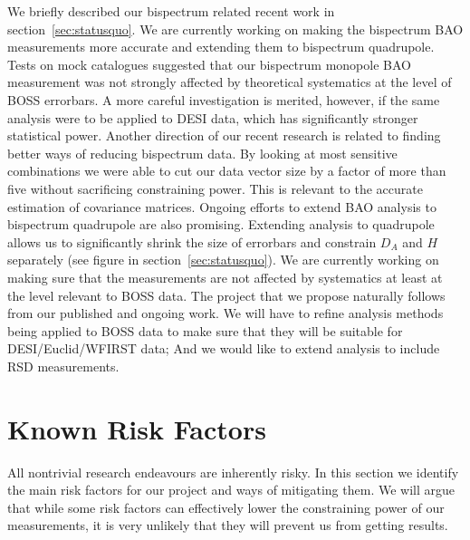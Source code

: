 We briefly described our bispectrum related recent work in
section~\ref{sec:statusquo}.  We are currently working on making the bispectrum
BAO measurements more accurate and extending them to bispectrum quadrupole.
Tests on mock catalogues suggested that our bispectrum monopole BAO measurement
was not strongly affected by theoretical systematics at the level of BOSS
errorbars. A more careful investigation is merited, however, if the same
analysis were to be applied to DESI data, which has significantly stronger
statistical power.  Another direction of our recent research is related to
finding better ways of reducing bispectrum data. By looking at most sensitive
combinations we were able to cut our data vector size by a factor of more than
five without sacrificing constraining power. This is relevant to the accurate
estimation of covariance matrices. Ongoing efforts to extend BAO analysis to
bispectrum quadrupole are also promising. Extending analysis to quadrupole
allows us to significantly shrink the size of errorbars and constrain $D_A$ and
$H$ separately (see figure in section~\ref{sec:statusquo}). We are currently
working on making sure that the measurements are not affected by systematics at
least at the level relevant to BOSS data. The project that we propose naturally
follows from our published and ongoing work. We will have to refine analysis
methods being applied to BOSS data to make sure that they will be suitable for
DESI/Euclid/WFIRST data; And we would like to extend analysis to include RSD
measurements.


\section{Known Risk Factors}

All nontrivial research endeavours are inherently risky. In this section we
identify the main risk factors for our project and ways of mitigating them. We
will argue that while some risk factors can effectively lower the constraining
power of our measurements, it is very unlikely that they will prevent us from
getting results.

